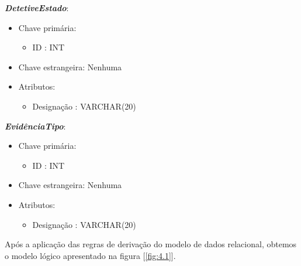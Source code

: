 \documentclass[a4paper,12pt]{scrreprt}
\begin{document}
        \clearpage
        
        \textbf{\textit{DetetiveEstado}}:
        \begin{itemize}
            \item Chave primária:
                \begin{itemize}
                    \item ID : INT
                \end{itemize}
            \item Chave estrangeira: Nenhuma
            \item Atributos:
                \begin{itemize}
                    \item Designação : VARCHAR(20)
                \end{itemize}
        \end{itemize}

        \vspace{0.5cm}
        
        \textbf{\textit{EvidênciaTipo}}:
        \begin{itemize}
            \item Chave primária:
                \begin{itemize}
                    \item ID : INT
                \end{itemize}
            \item Chave estrangeira: Nenhuma
            \item Atributos:
                \begin{itemize}
                    \item Designação : VARCHAR(20)
                \end{itemize}
        \end{itemize}

    Após a aplicação das regras de derivação do modelo de dados relacional, obtemos o modelo lógico apresentado na figura [\ref{fig:4.1}].
\end{document}
